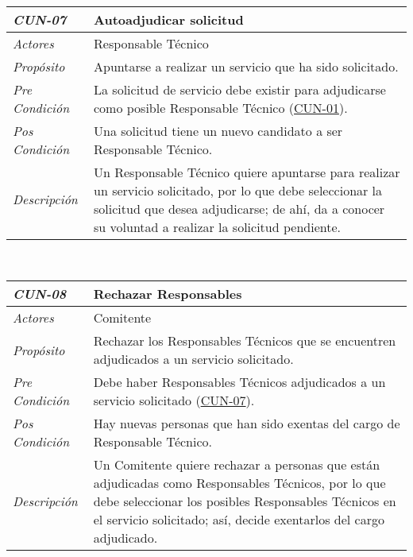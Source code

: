 \begin{center}
{\begin{tabular}{ | p{3cm} | p{12.5cm} | }
	\hline
\end{tabular}} \\[1cm]
\hypertarget{CUN-07}{%
\begin{tabular}{ | p{3cm} | p{12.5cm} | }
	\hline
	\rowcolor{lightgray}
	\hfil \textbf{\textit{CUN-07}} &
	\hfil \textbf{Autoadjudicar solicitud} \\
	\hline
	\raggedleft \textit{Actores} & Responsable T\'ecnico \\
	\hline
	\raggedleft \textit{Prop\'osito} & Apuntarse a realizar
	un servicio que ha sido solicitado. \\
	\hline
	\raggedleft \textit{Pre Condici\'on} & La solicitud
	de servicio debe existir para adjudicarse como posible
	Responsable T\'ecnico (\hyperlink{CUN-01}{CUN-01}). \\
	\hline
	\raggedleft \textit{Pos Condici\'on} & Una solicitud
	tiene un nuevo candidato a ser Responsable T\'ecnico. \\
	\hline
	\raggedleft \textit{Descripci\'on} &
	Un Responsable T\'ecnico quiere apuntarse para realizar
	un servicio solicitado, por lo que debe seleccionar la
	solicitud que desea adjudicarse; de ah\'i, da a conocer
	su voluntad a realizar la solicitud pendiente. \\
	\hline
\end{tabular}} \\[1cm]
\hypertarget{CUN-08}{%
\begin{tabular}{ | p{3cm} | p{12.5cm} | }
	\hline
	\rowcolor{lightgray}
	\hfil \textbf{\textit{CUN-08}} &
	\hfil \textbf{Rechazar Responsables} \\
	\hline
	\raggedleft \textit{Actores} & Comitente \\
	\hline
	\raggedleft \textit{Prop\'osito} & Rechazar los
	Responsables T\'ecnicos que se encuentren adjudicados
	a un servicio solicitado. \\
	\hline
	\raggedleft \textit{Pre Condici\'on} & Debe haber
	Responsables T\'ecnicos adjudicados a un servicio
	solicitado (\hyperlink{CUN-07}{CUN-07}). \\
	\hline
	\raggedleft \textit{Pos Condici\'on} & Hay nuevas
	personas que han sido exentas del cargo de
	Responsable T\'ecnico. \\
	\hline
	\raggedleft \textit{Descripci\'on} &
	Un Comitente quiere rechazar a personas que est\'an
	adjudicadas como Responsables T\'ecnicos, por lo que
	debe seleccionar los posibles Responsables T\'ecnicos
	en el servicio solicitado; as\'i, decide exentarlos
	del cargo adjudicado. \\

\end{tabular}}
\end{center}
